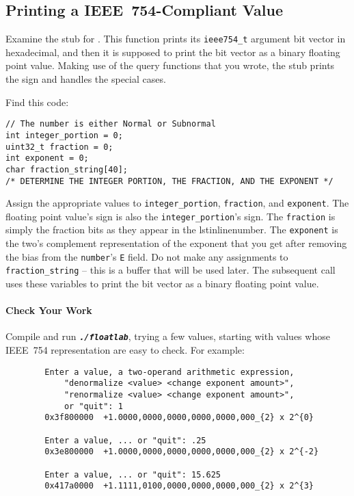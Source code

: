     \subsection{Printing a IEEE~754-Compliant Value}

    Examine the stub for .
    This function prints its \lstinline{ieee754_t} argument bit vector in hexadecimal, and then it is supposed to print the bit vector as a binary floating point value.
    Making use of the query functions that you wrote, the stub prints the sign and handles the special cases.

    Find this code:

    \begin{lstlisting}
// The number is either Normal or Subnormal
int integer_portion = 0;
uint32_t fraction = 0;
int exponent = 0;
char fraction_string[40];
/* DETERMINE THE INTEGER PORTION, THE FRACTION, AND THE EXPONENT */
    \end{lstlisting}

    Assign the appropriate values to \lstinline{integer_portion}, \lstinline{fraction}, and \lstinline{exponent}.
    The floating point value's sign is also the \lstinline{integer_portion}'s sign.
    The \lstinline{fraction} is simply the fraction bits as they appear in the lstinline{number}.
    The \lstinline{exponent} is the two's complement representation of the exponent that you get after removing the bias from the \lstinline{number}'s \texttt{E} field.
    Do not make any assignments to \lstinline{fraction_string} -- this is a buffer that will be used later.
    The subsequent  call uses these variables to print the bit vector as a binary floating point value.

    \paragraph*{Check Your Work}

    Compile and run \texttt{\textbf{\textit{./floatlab}}}, trying a few values, starting with values whose IEEE~754 representation are easy to check.
    For example:

    \begin{verbatim}
        Enter a value, a two-operand arithmetic expression,
            "denormalize <value> <change exponent amount>",
            "renormalize <value> <change exponent amount>",
            or "quit": 1
        0x3f800000	+1.0000,0000,0000,0000,0000,000_{2} x 2^{0}

        Enter a value, ... or "quit": .25
        0x3e800000	+1.0000,0000,0000,0000,0000,000_{2} x 2^{-2}

        Enter a value, ... or "quit": 15.625
        0x417a0000	+1.1111,0100,0000,0000,0000,000_{2} x 2^{3}
    \end{verbatim}

